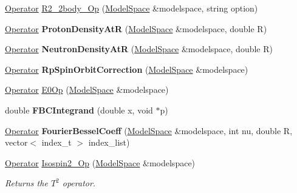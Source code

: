 \begin{DoxyCompactItemize}
\item 
\hyperlink{classOperator}{Operator} \hyperlink{namespaceimsrg__util_a151e28afb63f6efabd79705c5e579b8d}{R2\+\_\+2body\+\_\+\+Op} (\hyperlink{classModelSpace}{Model\+Space} \&modelspace, string option)
\item 
\mbox{\label{namespaceimsrg__util_a6d82db7f81919e9cf68f0be820e95ab4}} 
\hyperlink{classOperator}{Operator} {\bfseries Proton\+Density\+AtR} (\hyperlink{classModelSpace}{Model\+Space} \&modelspace, double R)
\item 
\mbox{\label{namespaceimsrg__util_aae1de3189350277cb646e775f334203a}} 
\hyperlink{classOperator}{Operator} {\bfseries Neutron\+Density\+AtR} (\hyperlink{classModelSpace}{Model\+Space} \&modelspace, double R)
\item 
\mbox{\label{namespaceimsrg__util_ab631992a39716b936fba29c6a4810a22}} 
\hyperlink{classOperator}{Operator} {\bfseries Rp\+Spin\+Orbit\+Correction} (\hyperlink{classModelSpace}{Model\+Space} \&modelspace)
\item 
\hyperlink{classOperator}{Operator} \hyperlink{namespaceimsrg__util_ad1e33474a16032712deea7f482ac4013}{E0\+Op} (\hyperlink{classModelSpace}{Model\+Space} \&modelspace)
\item 
\mbox{\label{namespaceimsrg__util_ad2d3b69dd40d6f169c90fdc3a1c97406}} 
double {\bfseries F\+B\+C\+Integrand} (double x, void $\ast$p)
\item 
\mbox{\label{namespaceimsrg__util_a972bcc628273b7c150efc8876e51c4ce}} 
\hyperlink{classOperator}{Operator} {\bfseries Fourier\+Bessel\+Coeff} (\hyperlink{classModelSpace}{Model\+Space} \&modelspace, int nu, double R, vector$<$ index\+\_\+t $>$ index\+\_\+list)
\item 
\mbox{\label{namespaceimsrg__util_a66d5ba101ce5692e1ac0ee635bddf6d0}} 
\hyperlink{classOperator}{Operator} \hyperlink{namespaceimsrg__util_a66d5ba101ce5692e1ac0ee635bddf6d0}{Isospin2\+\_\+\+Op} (\hyperlink{classModelSpace}{Model\+Space} \&modelspace)
\begin{DoxyCompactList}\small\item\em Returns the $ T^{2} $ operator. \end{DoxyCompactList}\item 

\end{DoxyCompactItemize}
